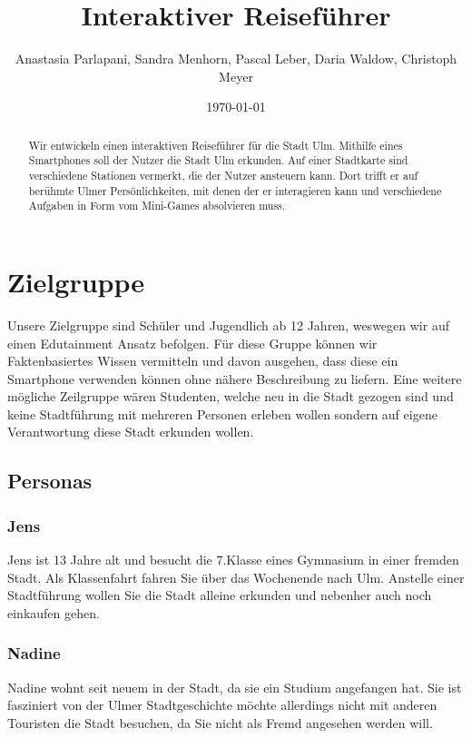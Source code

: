 \documentclass[]{hci-proposal}
\title{Interaktiver Reiseführer}
\author{Anastasia Parlapani, Sandra Menhorn, Pascal Leber, Daria Waldow, Christoph Meyer}
\date{\today}
\begin{document}

\maketitle

\begin{abstract}
  Wir entwickeln einen interaktiven Reiseführer für die Stadt Ulm. Mithilfe eines Smartphones soll
  der Nutzer die Stadt Ulm erkunden. Auf einer Stadtkarte sind verschiedene Stationen vermerkt, die
  der Nutzer ansteuern kann. Dort trifft er auf berühmte Ulmer Persönlichkeiten, mit denen der er
  interagieren kann und verschiedene Aufgaben in Form vom Mini-Games absolvieren muss.



\end{abstract}


\section{Zielgruppe}
Unsere Zielgruppe sind Schüler und Jugendlich ab 12 Jahren, weswegen wir auf einen Edutainment Ansatz befolgen.
Für diese Gruppe können wir Faktenbasiertes Wissen vermitteln und davon ausgehen, dass diese ein Smartphone verwenden können ohne nähere Beschreibung zu liefern.
Eine weitere mögliche Zeilgruppe wären Studenten, welche neu in die Stadt gezogen sind und keine Stadtführung mit mehreren Personen erleben wollen sondern auf eigene Verantwortung diese Stadt erkunden wollen.

\subsection{Personas}

\subsubsection*{Jens}
Jens ist 13 Jahre alt und besucht die 7.Klasse eines Gymnasium in einer fremden Stadt. Als Klassenfahrt fahren Sie über das Wochenende nach Ulm.
Anstelle einer Stadtführung wollen Sie die Stadt alleine erkunden und nebenher auch noch einkaufen gehen.
\subsubsection*{Nadine}
Nadine wohnt seit neuem in der Stadt, da sie ein Studium angefangen hat. 
Sie ist fasziniert von der Ulmer Stadtgeschichte möchte allerdings nicht mit anderen Touristen die Stadt besuchen, da Sie nicht als Fremd angesehen werden will.
\end{document}

